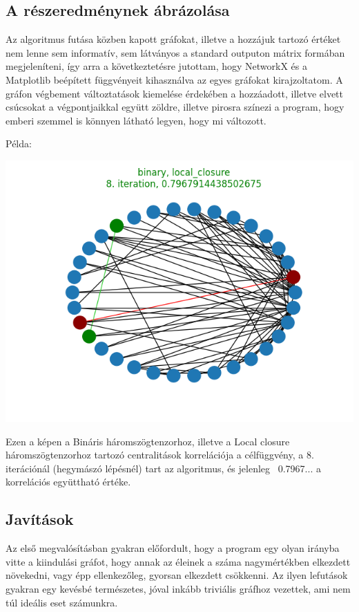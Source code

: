 \documentclass[12pt,numbers=noenddot]{report}
\begin{document}
\subsection{A részeredménynek ábrázolása}
Az algoritmus futása közben kapott gráfokat, illetve a hozzájuk tartozó értéket
nem lenne sem informatív, sem látványos a standard outputon mátrix formában 
megjeleníteni, így arra a következtetésre jutottam, hogy NetworkX és a 
Matplotlib beépített függvényeit kihasználva az egyes gráfokat kirajzoltatom.
A gráfon végbement változtatások kiemelése érdekében a hozzáadott, illetve
elvett csúcsokat a végpontjaikkal együtt zöldre, illetve pirosra színezi
a program, hogy emberi szemmel is könnyen látható legyen, hogy mi változott.

Példa:

\includegraphics[width=0.9\linewidth]{./images/find_similar_partial_result.png}

Ezen a képen a Bináris háromszögtenzorhoz, illetve a Local closure 
háromszögtenzorhoz tartozó centralitások korrelációja a célfüggvény,
a 8. iterációnál (hegymászó lépésnél) tart az algoritmus, és jelenleg 
~0.7967... a korrelációs együttható értéke.

\subsection{Javítások}

Az első megvalósításban gyakran előfordult, hogy a program egy olyan irányba
vitte a kiindulási gráfot, hogy annak az éleinek a száma nagymértékben elkezdett
növekedni, vagy épp ellenkezőleg, gyorsan elkezdett csökkenni. 
Az ilyen lefutások gyakran egy kevésbé természetes, jóval inkább triviális 
gráfhoz vezettek, ami nem túl ideális eset számunkra.
\end{document}
